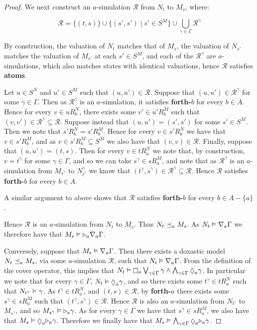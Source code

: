 \begin{proof}
We next construct an $a$-simulation $\mathcal{R}$ from $N_t$ to $M_s$,
where:

$$\mathcal{R} = \{(t, s)\} \cup \{(s', s') \mid s' \in S^M \} \cup \bigcup_{\gamma \in \Gamma} \mathcal{R}^\gamma$$

By construction, the valuation of $N_t$ matches that of $M_s$, the valuation of
$N_{s'}$ matches the valuation of $M_{s'}$ at each $s' \in S^M$, and each of the
$\mathcal{R}^\gamma$ are $a$-simulations, which also matches states with
identical valuations, hence $\mathcal{R}$ satisfies {\bf atoms}.

Let $u \in S^N$ and $u' \in S^M$ such that $(u, u') \in \mathcal{R}$. Suppose
that $(u, u') \in \mathcal{R}^\gamma$ for some $\gamma \in \Gamma$. Then as
$\mathcal{R}^\gamma$ is an $a$-simulation, it satisfies {\bf forth-$b$} for
every $b \in A$. Hence for every $v \in uR^N_b$, there exists some $v' \in
u'R^M_b$ such that $(v, v') \in \mathcal{R}^\gamma \subseteq \mathcal{R}$.
Suppose instead that $(u, u') = (s', s')$ for some $s' \in S^M$. Then we note
that $s'R^N_b = s'R^M_b$. Hence for every $v \in s'R^N_b$ we have that $v \in
s'R^M_b$, and as $v \in s'R^M_b \subseteq S^M$ we also have that $(v, v) \in
\mathcal{R}$. Finally, suppose that $(u, u') = (t, s)$. Then for every $v \in
tR^N_a$ we note that, by construction, $v = t^\gamma$ for some $\gamma \in
\Gamma$, and so we can take $s^\gamma \in sR^M_a$, and note that as
$\mathcal{R}^\gamma$ is an $a$-simulation from $M_{s^\gamma}$ to
$N^\gamma_{t^\gamma}$ we know that $(t^\gamma, s^\gamma) \in \mathcal{R}^\gamma
\subseteq \mathcal{R}$. Hence $\mathcal{R}$ satisfies {\bf forth-$b$} for every
$b \in A$.

A similar argument to above shows that $\mathcal{R}$ satisfies {\bf forth-$b$}
for every $b \in A - \{a\}$.

Hence $\mathcal{R}$ is an $a$-simulation from $N_t$ to $M_s$. Thus $N_t
\preceq_a M_s$. As $N_t \vDash \nabla_a \Gamma$ we therefore have that
$M_s \vDash {\ensuremath{\mathopen{\triangleright}}}_a \nabla_a \Gamma$.

Conversely, suppose that $M_s \vDash \nabla_a \Gamma$. Then there exists a
doxastic model $N_t \preceq_a M_s$, via some $a$-simulation $\mathcal{R}$,
such that $N_t \vDash \nabla_a \Gamma$. From the definition of the cover
operator, this implies that $N_t \entails \knows_a \bigvee_{\gamma \in \Gamma}
\gamma \land \bigwedge_{\gamma \in \Gamma} \suspects_a \gamma$. In particular we
note that for every $\gamma \in \Gamma$, $N_t \entails \suspects_a \gamma$, and
so there exists some $t^\gamma \in tR^N_a$ such that $N_{t^\gamma} \vDash
\gamma$. As $t^\gamma \in tR^N_a$, and $(t, s) \in \mathcal{R}$, by {\bf
forth-$a$} there exists some $s^\gamma \in sR^M_a$ such that $(t^\gamma, s^\gamma)
\in \mathcal{R}$. Hence $\mathcal{R}$ is also an $a$-simulation from
$N_{t^\gamma}$ to $M_{s^\gamma}$, and so $M_{s^\gamma} \vDash {\ensuremath{\mathopen{\triangleright}}}_a
\gamma$. As for every $\gamma \in \Gamma$ we have that $s^\gamma \in sR^M_a$, we
also have that $M_s \entails \suspects_a \somerefs_a \gamma$. Therefore we
finally have that $M_s \entails \bigwedge_{\gamma \in \Gamma} \suspects_a
\somerefs_a \gamma$.


\end{proof}

